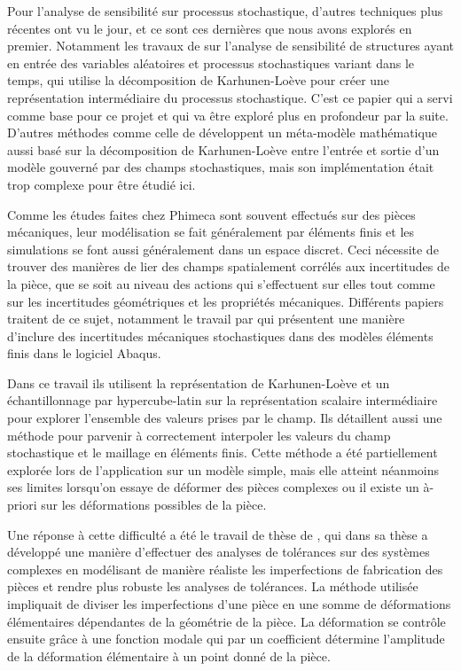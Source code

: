 \documentclass[a4paper,10pt]{article}
\begin{document}
Pour l'analyse de sensibilité sur processus stochastique, d'autres techniques plus récentes ont vu le jour, et ce sont ces dernières que nous avons explorés en premier. Notamment les travaux de \cite{Wei2017May} sur l'analyse de sensibilité de structures ayant en entrée des variables aléatoires et processus stochastiques variant dans le temps, qui utilise la décomposition de Karhunen-Loève pour créer une représentation intermédiaire du processus stochastique. C'est ce papier qui a servi comme base pour ce projet et qui va être exploré plus en profondeur par la suite. 
D'autres méthodes comme celle de \cite{Pronzato2019Jul} développent un méta-modèle mathématique aussi basé sur la décomposition de Karhunen-Loève entre l'entrée et sortie d'un modèle gouverné par des champs stochastiques, mais son implémentation était trop complexe pour être étudié ici. \par \smallskip

Comme les études faites chez Phimeca sont souvent effectués sur des pièces mécaniques, leur modélisation se fait généralement par éléments finis et les simulations se font aussi généralement dans un espace discret. Ceci nécessite de trouver des manières de lier des champs spatialement corrélés aux incertitudes de la pièce, que se soit au niveau des actions qui s'effectuent sur elles tout comme sur les incertitudes géométriques et les propriétés mécaniques. Différents papiers traitent  de ce sujet, notamment le travail par \cite{shangStochastic2013}  qui présentent une manière d'inclure des incertitudes mécaniques stochastiques dans des modèles éléments finis dans le logiciel Abaqus. \par \smallskip 

Dans ce travail ils utilisent la représentation de Karhunen-Loève et un échantillonnage par hypercube-latin sur la représentation scalaire intermédiaire pour explorer l'ensemble des valeurs prises par le champ. Ils détaillent aussi une méthode pour parvenir à correctement interpoler les valeurs du champ stochastique et le maillage en éléments finis. 
Cette méthode a été partiellement explorée lors de  l'application sur un modèle simple, mais elle atteint néanmoins ses limites lorsqu'on essaye de déformer des pièces complexes ou il existe un à-priori sur les déformations possibles de la pièce. \par \smallskip 

Une réponse à cette difficulté a été le travail de thèse de \cite{Goka2019Jun}, qui dans sa thèse a développé une manière d’effectuer des analyses de tolérances sur des systèmes complexes en modélisant de manière réaliste les imperfections de fabrication des pièces et rendre plus robuste les analyses de tolérances. La méthode utilisée impliquait de diviser les imperfections d'une pièce en une somme de déformations élémentaires dépendantes de la géométrie de la pièce. La déformation se contrôle ensuite grâce à une fonction modale qui par un coefficient détermine l'amplitude de la déformation élémentaire à un point donné de la pièce. \par \smallskip 
\end{document}

